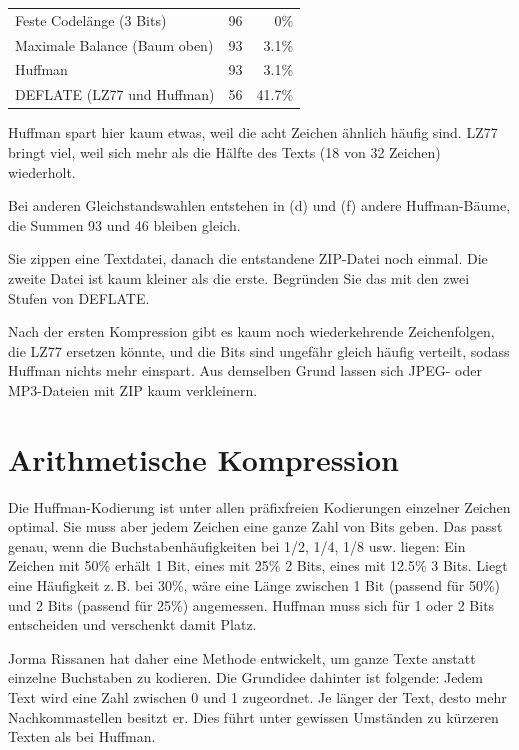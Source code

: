 \begin{myexercise}
\begin{myanswer}
\begin{aenum}[start=6]
\begin{center}
\begin{tabular}{lrr}
			      		Feste Codelänge (3 Bits) & 96 & 0\% \\
			      		Maximale Balance (Baum oben) & 93 & 3.1\% \\
			      		Huffman & 93 & 3.1\% \\
			      		DEFLATE (LZ77 und Huffman) & 56 & 41.7\%
			      	\end{tabular}
			      \end{center}
			      Huffman spart hier kaum etwas, weil die acht Zeichen ähnlich häufig sind. LZ77 bringt viel, weil sich mehr als die Hälfte des Texts (18 von 32 Zeichen) wiederholt.
		\end{aenum}
		Bei anderen Gleichstandswahlen entstehen in (d) und (f) andere Huffman-Bäume, die Summen 93 und 46 bleiben gleich.
	\end{myanswer}
\end{myexercise}

\begin{myexercise}\label{ex:zip-doppelt}
	Sie zippen eine Textdatei, danach die entstandene ZIP-Datei noch einmal. Die zweite Datei ist kaum kleiner als die erste. Begründen Sie das mit den zwei Stufen von DEFLATE.
	\begin{myanswer}
		Nach der ersten Kompression gibt es kaum noch wiederkehrende Zeichenfolgen, die LZ77 ersetzen könnte, und die Bits sind ungefähr gleich häufig verteilt, sodass Huffman nichts mehr einspart. Aus demselben Grund lassen sich JPEG- oder MP3-Dateien mit ZIP kaum verkleinern.
	\end{myanswer}
\end{myexercise}

\section{Arithmetische Kompression}
Die Huffman-Kodierung ist unter allen präfixfreien Kodierungen einzelner Zeichen optimal. Sie muss aber jedem Zeichen eine ganze Zahl von Bits geben. Das passt genau, wenn die Buchstabenhäufigkeiten bei 1/2, 1/4, 1/8 usw. liegen: Ein Zeichen mit 50\% erhält 1 Bit, eines mit 25\% 2 Bits, eines mit 12.5\% 3 Bits. Liegt eine Häufigkeit z.\,B. bei 30\%, wäre eine Länge zwischen 1 Bit (passend für 50\%) und 2 Bits (passend für 25\%) angemessen. Huffman muss sich für 1 oder 2 Bits entscheiden und verschenkt damit Platz.

Jorma Rissanen hat daher eine Methode entwickelt, um ganze Texte anstatt einzelne Buchstaben zu kodieren. Die Grundidee dahinter ist folgende: Jedem Text wird eine Zahl zwischen 0 und 1 zugeordnet. Je länger der Text, desto mehr Nachkommastellen besitzt er. Dies führt unter gewissen Umständen zu kürzeren Texten als bei Huffman.

